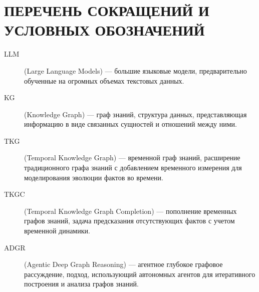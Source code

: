 \chapter*{ПЕРЕЧЕНЬ СОКРАЩЕНИЙ И УСЛОВНЫХ ОБОЗНАЧЕНИЙ}

\begin{description}
    \item[LLM] (Large Language Models) --- большие языковые модели, предварительно обученные на огромных объемах текстовых данных.
    \item[KG] (Knowledge Graph) --- граф знаний, структура данных, представляющая информацию в виде связанных сущностей и отношений между ними.
    \item[TKG] (Temporal Knowledge Graph) --- временной граф знаний, расширение традиционного графа знаний с добавлением временного измерения для моделирования эволюции фактов во времени.
    \item[TKGC] (Temporal Knowledge Graph Completion) --- пополнение временных графов знаний, задача предсказания отсутствующих фактов с учетом временной динамики.
    \item[ADGR] (Agentic Deep Graph Reasoning) --- агентное глубокое графовое рассуждение, подход, использующий автономных агентов для итеративного построения и анализа графов знаний.
\end{description}
